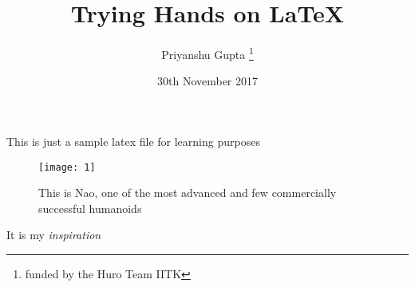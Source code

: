 \documentclass[12pt, a4paper]{article}
\title{Trying Hands on \textbf{\LaTeX{}}}
\author{Priyanshu Gupta \thanks{funded by the Huro Team IITK}}
\date{30th November 2017}
\begin{document}
 
\maketitle
 
This is just a sample latex file for learning purposes
 \begin{figure}[h]
    \maketitle
     \centering
     \texttt{[image: 1]}
     \caption[5pt]{This is Nao, one of the most advanced and few commercially successful humanoids}
     \label{fig:my_label}
 \end{figure}
 It is my \emph{inspiration}
\end{document}
